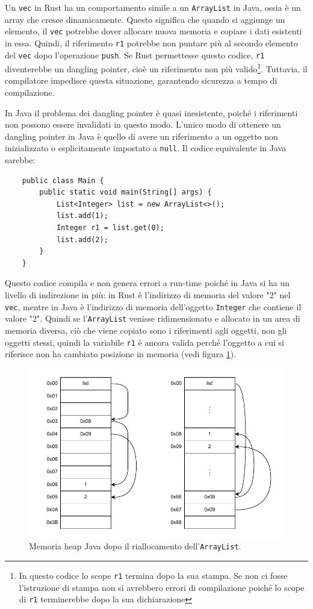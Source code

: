 Un \texttt{vec} in Rust ha un comportamento simile a un \texttt{ArrayList} in Java, ossia è un array che cresce dinamicamente. Questo significa che quando si aggiunge un elemento, il \texttt{vec} potrebbe dover allocare nuova memoria e copiare i dati esistenti in essa. Quindi, il riferimento \texttt{r1} potrebbe non puntare più al secondo elemento del \texttt{vec} dopo l'operazione \texttt{push}. Se Rust permettesse questo codice, \texttt{r1} diventerebbe un dangling pointer, cioè un riferimento non più valido\footnote{In questo codice lo scope \texttt{r1} termina dopo la sua stampa. Se non ci fosse l'istruzione di stampa non si avrebbero errori di compilazione poiché lo scope di \texttt{r1} terminerebbe dopo la sua dichiarazione}.
 Tuttavia, il compilatore impedisce questa situazione, garantendo sicurezza a tempo di compilazione.

In Java il problema dei dangling pointer è quasi inesistente, poiché i riferimenti non possono essere invalidati in questo modo. L'unico modo di ottenere un dangling pointer in Java è quello di avere un riferimento a un oggetto non inizializzato o esplicitamente impostato a \texttt{null}. Il codice equivalente in Java sarebbe:
\begin{verbatim}
    public class Main {
        public static void main(String[] args) {
            List<Integer> list = new ArrayList<>();
            list.add(1);
            Integer r1 = list.get(0);
            list.add(2);
        }
    }
\end{verbatim}
Questo codice compila e non genera errori a run-time poiché in Java si ha un livello di indirezione in più:  in Rust è l'indirizzo di memoria del valore "2" nel \texttt{vec}, mentre in Java è l'indirizzo di memoria dell'oggetto \texttt{Integer} che contiene il valore "2". Quindi se l'\texttt{ArrayList} venisse ridimensionato e allocato in un area di memoria diversa, ciò che viene copiato sono i riferimenti agli oggetti, non gli oggetti stessi, quindi la variabile \texttt{r1} è ancora valida perché l'oggetto a cui si riferisce non ha cambiato posizione in memoria (vedi figura \ref{fig:bor3}). 
\begin{figure}[H]
    \centering
    \includegraphics[width = \textwidth]{Figures/bor3.drawio.pdf}
    \caption{Memoria heap Java dopo il riallocamento dell'\texttt{ArrayList}.}
    \label{fig:bor3}
\end{figure}
